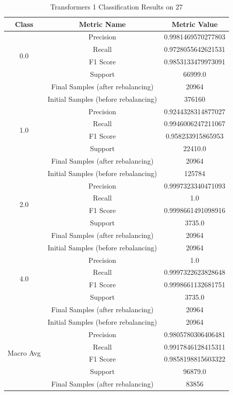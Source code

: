 \begin{longtable}{|c|c|c|}
\caption{Transformers 1 Classification Results on 27} \label{tab:27_transformers_1_classifiers_results} \\
\hline
Class & Metric Name & Metric Value \\
\hline
\multirow{4}{*}{0.0} & Precision & 0.9981469570277803 \\
 & Recall & 0.9728055642621531 \\
 & F1 Score & 0.9853133479973091 \\
 & Support & 66999.0 \\
 & Final Samples (after rebalancing) & 20964 \\
 & Initial Samples (before rebalancing) & 376160 \\
\hline
\multirow{4}{*}{1.0} & Precision & 0.9244328314877027 \\
 & Recall & 0.9946006247211067 \\
 & F1 Score & 0.958233915865953 \\
 & Support & 22410.0 \\
 & Final Samples (after rebalancing) & 20964 \\
 & Initial Samples (before rebalancing) & 125784 \\
\hline
\multirow{4}{*}{2.0} & Precision & 0.9997323340471093 \\
 & Recall & 1.0 \\
 & F1 Score & 0.9998661491098916 \\
 & Support & 3735.0 \\
 & Final Samples (after rebalancing) & 20964 \\
 & Initial Samples (before rebalancing) & 20964 \\
\hline
\multirow{4}{*}{4.0} & Precision & 1.0 \\
 & Recall & 0.9997322623828648 \\
 & F1 Score & 0.9998661132681751 \\
 & Support & 3735.0 \\
 & Final Samples (after rebalancing) & 20964 \\
 & Initial Samples (before rebalancing) & 20964 \\
\hline
\multirow{4}{*}{Macro Avg} & Precision & 0.9805780306406481 \\
 & Recall & 0.9917846128415311 \\
 & F1 Score & 0.9858198815603322 \\
 & Support & 96879.0 \\
 & Final Samples (after rebalancing) & 83856 \\

\end{longtable}

